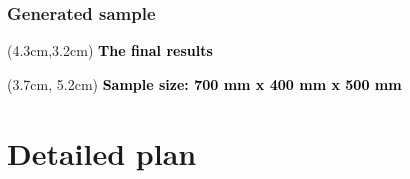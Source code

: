 \documentclass{EESD}
\begin{document}
\subsubsection{Generated sample}

\begin{frame}[t]{}
\begin{textblock*}{10cm}(4.3cm,3.2cm)
\Huge\textbf{\textcolor{black}{The final results}}
\end{textblock*}
\begin{textblock*}{10cm}(3.7cm, 5.2cm)
\normalsize\textbf{\textcolor{black}{Sample size: 700 mm x 400 mm x 500 mm}}
\end{textblock*}
\end{frame}
\usebackgroundtemplate{}


\section{Detailed plan}
\end{document}
